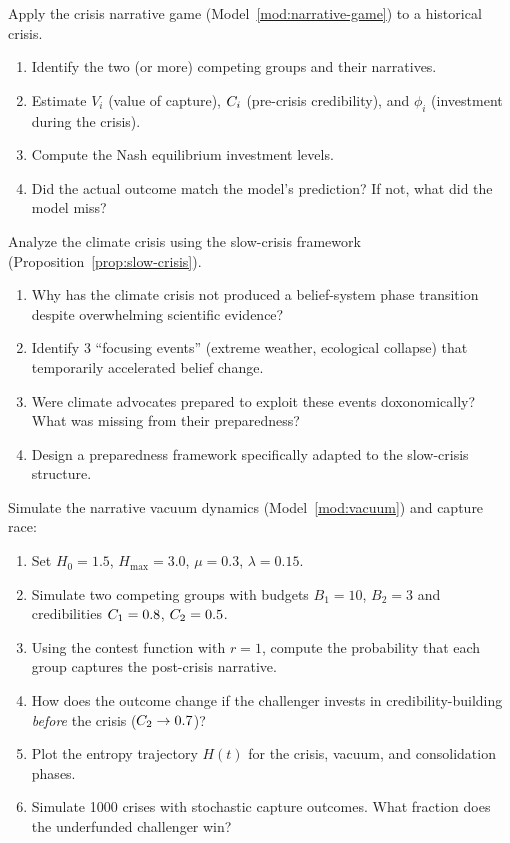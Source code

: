 \begin{exercise}
Apply the crisis narrative game (Model~\ref{mod:narrative-game}) to a historical crisis.
\begin{enumerate}[nosep]
  \item Identify the two (or more) competing groups and their narratives.
  \item Estimate $V_i$ (value of capture), $C_{i}$ (pre-crisis credibility), and $\phi_i$ (investment during the crisis).
  \item Compute the Nash equilibrium investment levels.
  \item Did the actual outcome match the model's prediction? If not, what did the model miss?
\end{enumerate}
\end{exercise}

\begin{exercise}
Analyze the climate crisis using the slow-crisis framework (Proposition~\ref{prop:slow-crisis}).
\begin{enumerate}[nosep]
  \item Why has the climate crisis not produced a belief-system phase transition despite overwhelming scientific evidence?
  \item Identify 3 ``focusing events'' (extreme weather, ecological collapse) that temporarily accelerated belief change.
  \item Were climate advocates prepared to exploit these events doxonomically? What was missing from their preparedness?
  \item Design a preparedness framework specifically adapted to the slow-crisis structure.
\end{enumerate}
\end{exercise}

\begin{exercise}[Computational]
Simulate the narrative vacuum dynamics (Model~\ref{mod:vacuum}) and capture race:
\begin{enumerate}[nosep]
  \item Set $H_0 = 1.5$, $H_{\max} = 3.0$, $\mu = 0.3$, $\lambda = 0.15$.
  \item Simulate two competing groups with budgets $B_1 = 10$, $B_2 = 3$ and credibilities $C_{1} = 0.8$, $C_{2} = 0.5$.
  \item Using the contest function with $r = 1$, compute the probability that each group captures the post-crisis narrative.
  \item How does the outcome change if the challenger invests in credibility-building \emph{before} the crisis ($C_{2} \to 0.7$)?
  \item Plot the entropy trajectory $H(t)$ for the crisis, vacuum, and consolidation phases.
  \item Simulate 1000 crises with stochastic capture outcomes. What fraction does the underfunded challenger win?
\end{enumerate}
\end{exercise}
